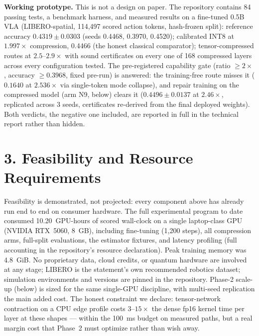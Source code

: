 \documentclass[10pt]{article}
\begin{document}
\textbf{Working prototype.} This is not a design on paper. The repository
contains 84 passing tests, a benchmark harness, and measured results on a
fine-tuned 0.5B VLA (LIBERO-spatial, 114{,}497 scored action tokens,
hash-frozen split): reference accuracy $0.4319 \pm 0.0303$ (seeds 0.4468,
0.3970, 0.4520); calibrated INT8 at
$1.997\times$ compression, 0.4466 (the honest classical comparator);
tensor-compressed routes at $2.5$--$2.9\times$ with sound certificates on
every one of 168 compressed layers across every configuration tested. The
pre-registered capability gate (ratio $\ge 2\times$, accuracy $\ge 0.3968$,
fixed pre-run) is answered: the training-free route misses it
($0.1640$ at $2.536\times$ via single-token mode collapse),
and repair training on the compressed model (arm N9, below) clears it
($0.4496 \pm 0.0137$ at $2.46\times$, replicated across 3 seeds,
certificates re-derived from the final deployed weights). Both
verdicts, the negative one included, are reported in full in the technical
report rather than hidden.

\section*{3. Feasibility and Resource Requirements}
Feasibility is demonstrated, not projected: every component above has already
run end to end on consumer hardware. The full experimental program to date
consumed 10.20~GPU-hours of scored wall-clock on a single laptop-class GPU
(NVIDIA RTX~5060, 8~GB), including fine-tuning (1{,}200 steps), all
compression arms, full-split evaluations, the estimator fixtures, and latency
profiling (full accounting in the repository's resource declaration). Peak training
memory was 4.8~GiB. No proprietary data, cloud credits, or quantum hardware
are involved at any stage; LIBERO is the statement's own recommended robotics
dataset; simulation environments and versions are pinned in the repository.
Phase-2 scale-up (below) is sized for the same single-GPU discipline, with
multi-seed replication the main added cost. The honest constraint we declare:
tensor-network contraction on a CPU edge profile costs $3$--$15\times$ the
dense fp16 kernel time per layer at these shapes --- within the 100~ms budget
on measured paths, but a real margin cost that Phase~2 must optimize rather
than wish away.

\end{document}
